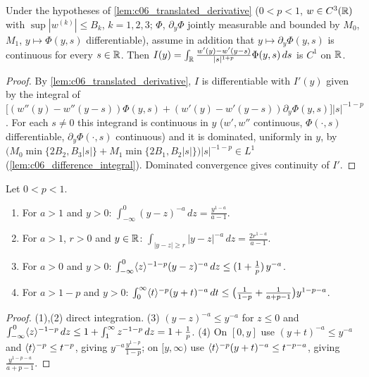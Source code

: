 \begin{lemma}
  \label{lem:c06_translated_C1}
  Under the hypotheses of \cref{lem:c06_translated_derivative} ($0<p<1$, $w\in C^3(\mathbb{R})$ with
  $\sup|w^{(k)}|\le B_k$, $k=1,2,3$; $\Phi$, $\partial_y\Phi$ jointly measurable and bounded by $M_0$, $M_1$,
  $y\mapsto\Phi(y,s)$ differentiable), assume in addition that $y\mapsto\partial_y\Phi(y,s)$ is continuous for every
  $s\in\mathbb{R}$. Then $I(y)=\int_{\mathbb{R}}\frac{w'(y)-w'(y-s)}{|s|^{1+p}}\Phi(y,s)\,ds$ is $C^1$ on $\mathbb{R}$.
\end{lemma}
\begin{proof}
  By \cref{lem:c06_translated_derivative}, $I$ is differentiable with $I'(y)$ given by the integral of
  $\bigl[(w''(y)-w''(y-s))\Phi(y,s)+(w'(y)-w'(y-s))\partial_y\Phi(y,s)\bigr]|s|^{-1-p}$. For each $s\ne0$ this
  integrand is continuous in $y$ ($w',w''$ continuous, $\Phi(\cdot,s)$ differentiable, $\partial_y\Phi(\cdot,s)$
  continuous) and it is dominated, uniformly in $y$, by
  $\bigl(M_0\min\{2B_2,B_3|s|\}+M_1\min\{2B_1,B_2|s|\}\bigr)|s|^{-1-p}\in L^1$ (\cref{lem:c06_difference_integral}).
  Dominated convergence gives continuity of $I'$.
\end{proof}

\begin{lemma}
  \label{lem:c06_tail_integrals}
  Let $0<p<1$.
  \begin{enumerate}
    \item For $a>1$ and $y>0$: $\int_{-\infty}^0(y-z)^{-a}\,dz=\frac{y^{1-a}}{a-1}$.
    \item For $a>1$, $r>0$ and $y\in\mathbb{R}$: $\int_{|y-z|\geq r}|y-z|^{-a}\,dz=\frac{2r^{1-a}}{a-1}$.
    \item For $a>0$ and $y>0$: $\int_{-\infty}^0\langle z \rangle^{-1-p}(y-z)^{-a}\,dz\leq(1+\frac1p)\,y^{-a}$.
    \item For $a>1-p$ and $y>0$: $\int_0^\infty\langle t \rangle^{-p}(y+t)^{-a}\,dt\leq\bigl(\frac1{1-p}+\frac1{a+p-1}\bigr)y^{1-p-a}$.
  \end{enumerate}
\end{lemma}
\begin{proof}
  (1),(2) direct integration. (3) $(y-z)^{-a}\leq y^{-a}$ for $z\leq0$ and
  $\int_{-\infty}^0\langle z \rangle^{-1-p}\,dz\leq1+\int_1^\infty z^{-1-p}\,dz=1+\frac1p$.
  (4) On $[0,y]$ use $(y+t)^{-a}\leq y^{-a}$ and $\langle t \rangle^{-p}\leq t^{-p}$, giving
  $y^{-a}\frac{y^{1-p}}{1-p}$; on $[y,\infty)$ use $\langle t \rangle^{-p}(y+t)^{-a}\leq t^{-p-a}$, giving
  $\frac{y^{1-p-a}}{a+p-1}$.
\end{proof}

